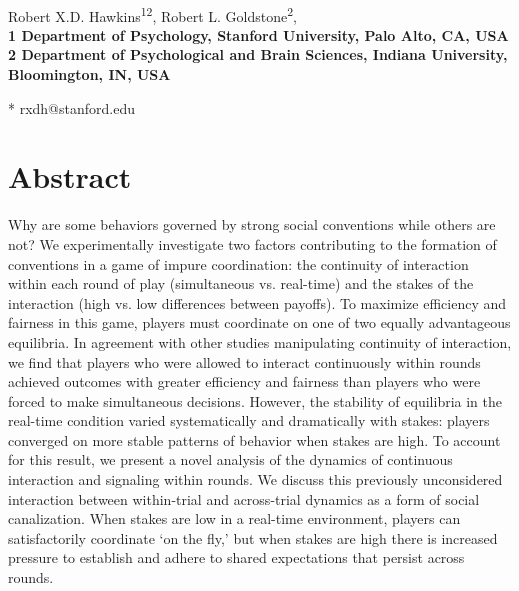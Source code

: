 \documentclass[10pt,letterpaper]{article}
\date{}
\begin{document}
\vspace*{0.35in}

\begin{flushleft}
{\Large
\textbf{}
}
\newline
\\
Robert X.D. Hawkins\textsuperscript{12},
Robert L. Goldstone\textsuperscript{2},
\\
\bigskip
\bf{1} Department of Psychology, Stanford University, Palo Alto, CA, USA
\\
\bf{2} Department of Psychological and Brain Sciences, Indiana University, Bloomington, IN, USA
\\
\bigskip

% 
%


* rxdh@stanford.edu

\end{flushleft}
\section*{Abstract}
Why are some behaviors governed by strong social conventions while others are not? We experimentally investigate two factors contributing to the formation of conventions in a game of impure coordination: the continuity of interaction within each round of play (simultaneous vs. real-time) and the stakes of the interaction (high vs. low differences between payoffs). To maximize efficiency and fairness in this game, players must coordinate on one of two equally advantageous equilibria. In agreement with other studies manipulating continuity of interaction, we find that players who were allowed to interact continuously within rounds achieved outcomes with greater efficiency and fairness than players who were forced to make simultaneous decisions. However, the stability of equilibria in the real-time condition varied systematically and dramatically with stakes: players converged on more stable patterns of behavior when stakes are high. To account for this result, we present a novel analysis of the dynamics of continuous interaction and signaling within rounds. We discuss this previously unconsidered interaction between within-trial and across-trial dynamics as a form of social canalization. When stakes are low in a real-time environment, players can satisfactorily coordinate `on the fly,' but when stakes are high there is increased pressure to establish and adhere to shared expectations that persist across rounds.
\end{document}
